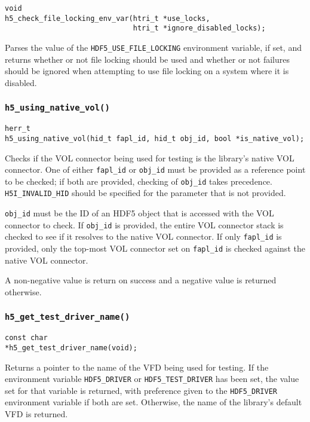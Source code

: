 \documentclass[../HDF5_RFC.tex]{subfiles}
\begin{document}
\begin{verbatim}
void
h5_check_file_locking_env_var(htri_t *use_locks,
                              htri_t *ignore_disabled_locks);
\end{verbatim}

Parses the value of the \texttt{HDF5\_USE\_FILE\_LOCKING} environment variable, if set, and
returns whether or not file locking should be used and whether or not failures should be
ignored when attempting to use file locking on a system where it is disabled.

\subsubsection{\texttt{h5\_using\_native\_vol()}}
\label{apdx:h5test_h5usingnativevol}

\begin{verbatim}
herr_t
h5_using_native_vol(hid_t fapl_id, hid_t obj_id, bool *is_native_vol);
\end{verbatim}

Checks if the VOL connector being used for testing is the library's native VOL connector. One of
either \texttt{fapl\_id} or \texttt{obj\_id} must be provided as a reference point to be checked;
if both are provided, checking of \texttt{obj\_id} takes precedence. \texttt{H5I\_INVALID\_HID}
should be specified for the parameter that is not provided.

\texttt{obj\_id} must be the ID of an HDF5 object that is accessed with the VOL connector to check.
If \texttt{obj\_id} is provided, the entire VOL connector stack is checked to see if it resolves
to the native VOL connector. If only \texttt{fapl\_id} is provided, only the top-most VOL connector
set on \texttt{fapl\_id} is checked against the native VOL connector.

A non-negative value is return on success and a negative value is returned otherwise.

\subsubsection{\texttt{h5\_get\_test\_driver\_name()}}

\begin{verbatim}
const char
*h5_get_test_driver_name(void);
\end{verbatim}

Returns a pointer to the name of the VFD being used for testing. If the environment variable
\texttt{HDF5\_DRIVER} or \texttt{HDF5\_TEST\_DRIVER} has been set, the value set for that variable
is returned, with preference given to the \texttt{HDF5\_DRIVER} environment variable if both are set.
Otherwise, the name of the library's default VFD is returned.
\end{document}

